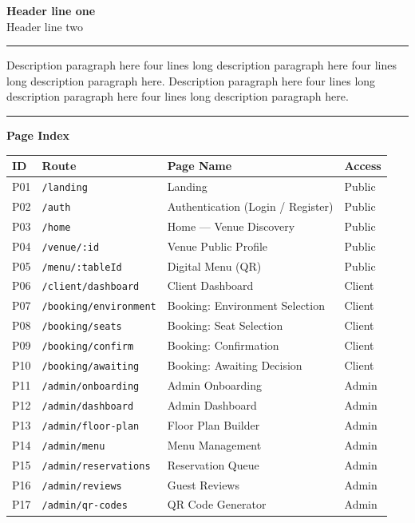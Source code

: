 \documentclass[12pt,a4paper]{article}
\begin{document}
{\large\bfseries Header line one}\\[2pt]{\small Header line two}
\vspace{4pt}\noindent\rule{\linewidth}{0.4pt}\vspace{8pt}

Description paragraph here four lines long description paragraph here four lines long description paragraph here. Description paragraph here four lines long description paragraph here four lines long description paragraph here.

\vspace{10pt}\noindent\rule{\linewidth}{0.2pt}\vspace{6pt}
\textbf{Page Index}\vspace{4pt}
{\footnotesize\begin{tabular}{@{}l l p{6cm} l@{}}
\toprule\textbf{ID}&\textbf{Route}&\textbf{Page Name}&\textbf{Access}\\\midrule
P01&\texttt{/landing}&Landing&Public\\
P02&\texttt{/auth}&Authentication (Login / Register)&Public\\
P03&\texttt{/home}&Home --- Venue Discovery&Public\\
P04&\texttt{/venue/:id}&Venue Public Profile&Public\\
P05&\texttt{/menu/:tableId}&Digital Menu (QR)&Public\\
P06&\texttt{/client/dashboard}&Client Dashboard&Client\\
P07&\texttt{/booking/environment}&Booking: Environment Selection&Client\\
P08&\texttt{/booking/seats}&Booking: Seat Selection&Client\\
P09&\texttt{/booking/confirm}&Booking: Confirmation&Client\\
P10&\texttt{/booking/awaiting}&Booking: Awaiting Decision&Client\\
P11&\texttt{/admin/onboarding}&Admin Onboarding&Admin\\
P12&\texttt{/admin/dashboard}&Admin Dashboard&Admin\\
P13&\texttt{/admin/floor-plan}&Floor Plan Builder&Admin\\
P14&\texttt{/admin/menu}&Menu Management&Admin\\
P15&\texttt{/admin/reservations}&Reservation Queue&Admin\\
P16&\texttt{/admin/reviews}&Guest Reviews&Admin\\
P17&\texttt{/admin/qr-codes}&QR Code Generator&Admin\\

\end{tabular}}
\end{document}
